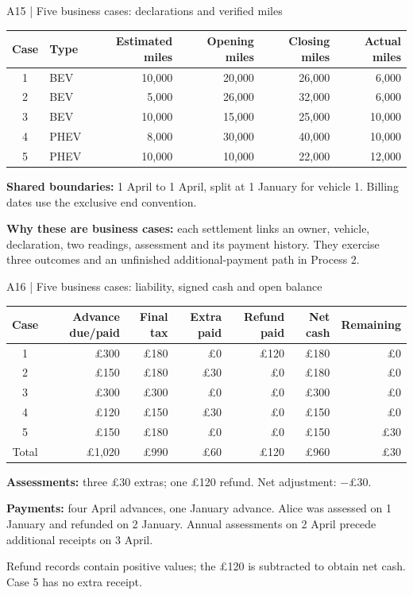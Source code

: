 \begin{frame}{A15 | Five business cases: declarations and verified miles}
\begin{center}
\begin{tabular}{@{}clrrrr@{}}\toprule
Case & Type & Estimated miles & Opening miles & Closing miles & Actual miles\\\midrule
1 & BEV & 10,000 & 20,000 & 26,000 & 6,000\\
2 & BEV & 5,000 & 26,000 & 32,000 & 6,000\\
3 & BEV & 10,000 & 15,000 & 25,000 & 10,000\\
4 & PHEV & 8,000 & 30,000 & 40,000 & 10,000\\
5 & PHEV & 10,000 & 10,000 & 22,000 & 12,000\\\bottomrule
\end{tabular}
\end{center}
\textbf{Shared boundaries:} 1 April to 1 April, split at 1 January for vehicle 1. Billing dates use the exclusive end convention.
\par\medskip
\textbf{Why these are business cases:} each settlement links an owner, vehicle, declaration, two readings, assessment and its payment history. They exercise three outcomes and an unfinished additional-payment path in Process 2.
\end{frame}

\begin{frame}{A16 | Five business cases: liability, signed cash and open balance}
\small
\begin{center}
\begin{tabular}{@{}crrrrrr@{}}\toprule
Case & Advance due/paid & Final tax & Extra paid & Refund paid & Net cash & Remaining\\\midrule
1 & £300 & £180 & £0 & £120 & £180 & £0\\
2 & £150 & £180 & £30 & £0 & £180 & £0\\
3 & £300 & £300 & £0 & £0 & £300 & £0\\
4 & £120 & £150 & £30 & £0 & £150 & £0\\
5 & £150 & £180 & £0 & £0 & £150 & \alert{£30}\\\midrule
Total & £1,020 & £990 & £60 & £120 & £960 & £30\\\bottomrule
\end{tabular}
\end{center}
\textbf{Assessments:} three £30 extras; one £120 refund. Net adjustment: −£30.
\par\medskip
\textbf{Payments:} four April advances, one January advance. Alice was assessed on 1 January and refunded on 2 January. Annual assessments on 2 April precede additional receipts on 3 April.
\par\smallskip
Refund records contain positive values; the £120 is subtracted to obtain net cash. Case 5 has no extra receipt.
\end{frame}

